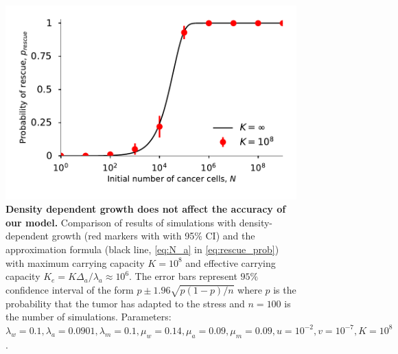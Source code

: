 \documentclass[12pt]{extarticle}
\begin{document}
\begin{figure}
\vspace*{1\baselineskip}
\includegraphics[width=1\textwidth]{Figures/SurvPlotNDataLogisticK.pdf}
\caption{\textbf{Density dependent growth does not affect the accuracy of our model.} Comparison of results of simulations  with density-dependent growth (red markers with with 95\% CI) and the approximation formula (black line, \cref{eq:N_a} in \cref{eq:rescue_prob}) with maximum carrying capacity $K=10^8$ and effective carrying capacity $K_e=K\Delta_a/\lambda_a\approx10^6$. The error bars represent $95\%$ confidence interval of the form $p\pm1.96\sqrt{p\left(1-p\right)/n}$ where $p$ is the  probability that the tumor has adapted to the stress and $n=100$ is the number of simulations. Parameters: $\lambda_w=0.1,\lambda_a=0.0901,\lambda_m=0.1,\mu_w=0.14,\mu_a=0.09,\mu_m=0.09, u=10^{-2}, v=10^{-7}, K=10^8$.}
\label{LogisticPlot}
\end{figure}

\end{document}
